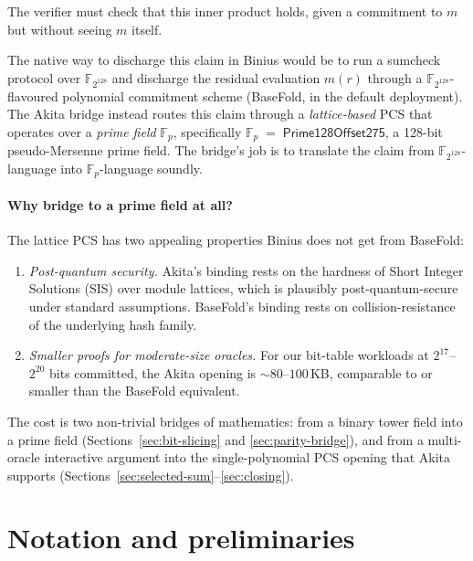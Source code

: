 \documentclass[11pt,a4paper]{article}
\theoremstyle{definition}
\theoremstyle{remark}
\newcommand{\binF}{\mathbb{F}_{2^{128}}}        %
\newcommand{\akF}{\mathbb{F}_{p}}                %
\newcommand{\Message}{m}                          %
\begin{document}
The verifier must check that this inner product holds, given a
commitment to $\Message$ but without seeing $\Message$ itself.

The native way to discharge this claim in Binius would be to run a
sumcheck protocol over $\binF$ and discharge the residual evaluation
$\Message(r)$ through a $\binF$-flavoured polynomial commitment scheme
(BaseFold, in the default deployment). The Akita bridge instead routes
this claim through a \emph{lattice-based} PCS that operates over a
\emph{prime field} $\akF$, specifically $\akF \;=\;
\mathsf{Prime128Offset275}$, a 128-bit pseudo-Mersenne prime field. The
bridge's job is to translate the claim from $\binF$-language into
$\akF$-language soundly.

\paragraph{Why bridge to a prime field at all?}
The lattice PCS has two appealing properties Binius does not get from
BaseFold:

\begin{enumerate}[leftmargin=*, itemsep=2pt]
  \item \emph{Post-quantum security.} Akita's binding rests on the
        hardness of Short Integer Solutions (SIS) over module lattices,
        which is plausibly post-quantum-secure under standard
        assumptions. BaseFold's binding rests on collision-resistance
        of the underlying hash family.
  \item \emph{Smaller proofs for moderate-size oracles.} For our
        bit-table workloads at $2^{17}$–$2^{20}$ bits committed, the
        Akita opening is $\sim 80$–$100$\,KB, comparable to or smaller
        than the BaseFold equivalent.
\end{enumerate}

The cost is two non-trivial bridges of mathematics: from a binary tower
field into a prime field (Sections~\ref{sec:bit-slicing} and
\ref{sec:parity-bridge}), and from a multi-oracle interactive argument
into the single-polynomial PCS opening that Akita supports
(Sections~\ref{sec:selected-sum}--\ref{sec:closing}).


\section{Notation and preliminaries}
\label{sec:notation}
\end{document}
